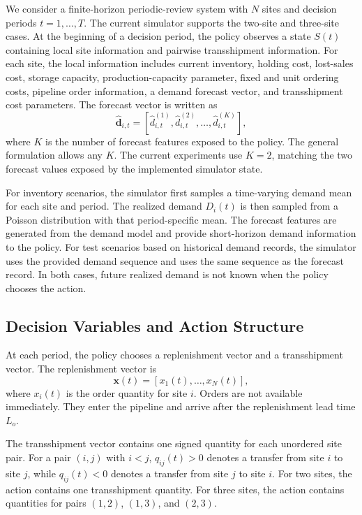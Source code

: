 \documentclass[journal]{IEEEtran}
\begin{document}
We consider a finite-horizon periodic-review system with $N$ sites and decision periods $t=1,\ldots,T$. The current simulator supports the two-site and three-site cases. At the beginning of a decision period, the policy observes a state $S(t)$ containing local site information and pairwise transshipment information. For each site, the local information includes current inventory, holding cost, lost-sales cost, storage capacity, production-capacity parameter, fixed and unit ordering costs, pipeline order information, a demand forecast vector, and transshipment cost parameters. The forecast vector is written as
\begin{equation}
    \hat{\mathbf{d}}_{i,t}=\left[\hat{d}^{(1)}_{i,t},\hat{d}^{(2)}_{i,t},\ldots,\hat{d}^{(K)}_{i,t}\right],
\end{equation}
where $K$ is the number of forecast features exposed to the policy. The general formulation allows any $K$. The current experiments use $K=2$, matching the two forecast values exposed by the implemented simulator state.

For inventory scenarios, the simulator first samples a time-varying demand mean for each site and period. The realized demand $D_i(t)$ is then sampled from a Poisson distribution with that period-specific mean. The forecast features are generated from the demand model and provide short-horizon demand information to the policy. For test scenarios based on historical demand records, the simulator uses the provided demand sequence and uses the same sequence as the forecast record. In both cases, future realized demand is not known when the policy chooses the action.

\subsection{Decision Variables and Action Structure}

At each period, the policy chooses a replenishment vector and a transshipment vector. The replenishment vector is
\begin{equation}
    \mathbf{x}(t)=\left[x_1(t),\ldots,x_N(t)\right],
\end{equation}
where $x_i(t)$ is the order quantity for site $i$. Orders are not available immediately. They enter the pipeline and arrive after the replenishment lead time $L_o$.

The transshipment vector contains one signed quantity for each unordered site pair. For a pair $(i,j)$ with $i<j$, $q_{ij}(t)>0$ denotes a transfer from site $i$ to site $j$, while $q_{ij}(t)<0$ denotes a transfer from site $j$ to site $i$. For two sites, the action contains one transshipment quantity. For three sites, the action contains quantities for pairs $(1,2)$, $(1,3)$, and $(2,3)$.
\end{document}
